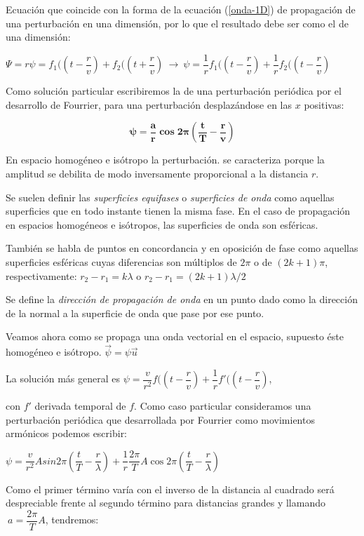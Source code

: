 Ecuación que coincide con la forma de la ecuación (\ref{onda-1D}) de propagación de una perturbación en una dimensión, por lo que el resultado debe ser como el de una dimensión:

$\Psi= r \psi = f_1(\left( t-\dfrac r v \right)+f_2(\left( t+\dfrac r v \right) \ \to \ \psi = \dfrac 1 r f_1(\left( t-\dfrac r v \right)+ \dfrac 1 r f_2(\left( t-\dfrac r v \right)$

Como solución particular escribiremos la de una perturbación periódica por el desarrollo de Fourrier, para una perturbación desplazándose en las $x$ positivas:

\begin{equation}
\boldsymbol{ \psi= \dfrac a r \cos 2\pi \left( \dfrac t T - \dfrac r v  \right)	}
\end{equation}

En espacio homogéneo e isótropo la perturbación. se caracteriza porque la amplitud se debilita de modo inversamente proporcional a la distancia $r$.

Se suelen definir las \emph{superficies equifases} o \emph{superficies de onda} como aquellas superficies que en todo instante tienen la misma fase. En el caso de propagación en espacios homogéneos e isótropos, las superficies de onda son esféricas.

También se habla de puntos en concordancia y en oposición de fase como aquellas superficies esféricas cuyas diferencias son múltiplos de $2\pi$ o de $(2k+1)\pi$, respectivamente: $r_2-r_1=k\lambda$ o $r_2-r_1=(2k+1)\lambda/2$

Se define la \emph{dirección de propagación de onda} en un punto dado como la dirección de la normal a la superficie de onda que pase por ese punto.

Veamos ahora como se propaga una onda vectorial en el espacio, supuesto éste homogéneo e isótropo. $\vec \psi=\psi \vec u$

La solución más general es $ \psi=\dfrac v{r^2} f(\left( t-\dfrac r v \right) + \dfrac 1 r f'(\left( t-\dfrac r v \right)$, 

con $f'$ derivada temporal de $f$. Como caso particular consideramos una perturbación periódica que desarrollada por Fourrier como movimientos armónicos podemos escribir:

$\psi  = \dfrac v{r^2} A sin 2\pi \left( \dfrac t T - \dfrac r \lambda \right)+\dfrac 1 r \dfrac {2\pi}{T} A \cos 2 \pi \left( \dfrac t T - \dfrac r \lambda \right)$

Como el primer término varía con el inverso de la distancia al cuadrado será despreciable frente al segundo término para distancias grandes y llamando $\ a=\dfrac{2\pi}{T} A$, tendremos:

